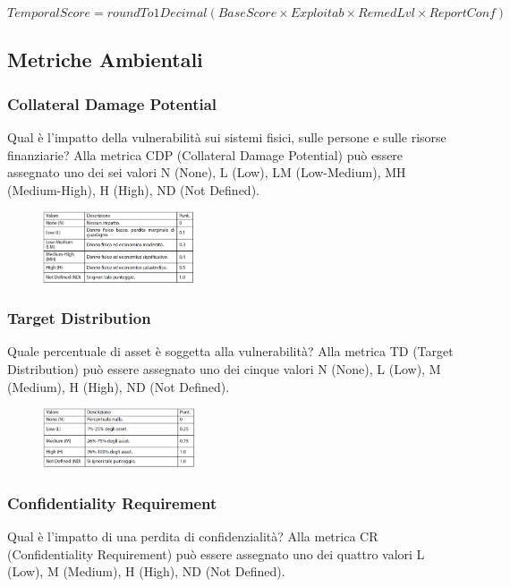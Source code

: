 \[TemporalScore = roundTo1Decimal(BaseScore \times Exploitab \times RemedLvl \times ReportConf)\]

\subsection{Metriche Ambientali}
\subsubsection{Collateral Damage Potential}
Qual è l’impatto della vulnerabilità sui sistemi fisici,
sulle persone e sulle risorse finanziarie? Alla metrica CDP (Collateral Damage Potential) può essere assegnato
uno dei sei valori N (None), L (Low), LM (Low-Medium),
MH (Medium-High), H (High), ND (Not Defined).

\begin{figure}[hbpt!]
    \centering
    \includegraphics[width=0.4\textwidth]{./Images/cap2/2.18.png}
\end{figure}
\FloatBarrier

\subsubsection{Target Distribution}
Quale percentuale di asset
è soggetta alla vulnerabilità? Alla metrica TD (Target Distribution) può essere assegnato uno
dei cinque valori N (None), L (Low),
M (Medium), H (High), ND (Not Defined).

\begin{figure}[hbpt!]
    \centering
    \includegraphics[width=0.4\textwidth]{./Images/cap2/2.19.png}
\end{figure}
\FloatBarrier

\subsubsection{Confidentiality Requirement}
Qual è l’impatto di una
perdita di confidenzialità? Alla metrica CR (Confidentiality Requirement) può essere
assegnato uno dei quattro valori
L (Low), M (Medium), H (High), ND (Not Defined).

